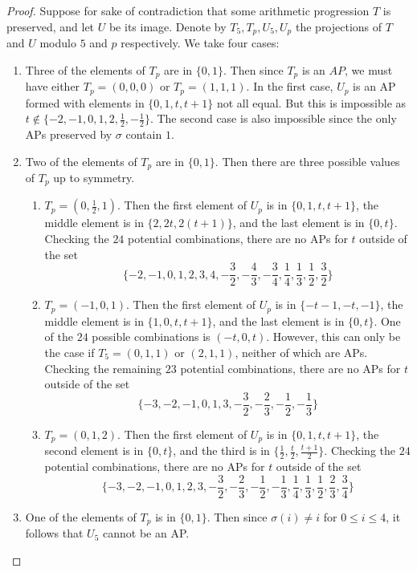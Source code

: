 \documentclass[12pt]{amsart}
\theoremstyle{definition}
\theoremstyle{remark}
\begin{document}
\begin{proof}
Suppose for sake of contradiction that some arithmetic progression $T$ is preserved, and let $U$ be its image. Denote by $T_5, T_p, U_5, U_p$ the projections of $T$ and $U$ modulo $5$ and $p$ respectively. We take four cases:
\begin{enumerate}
\item Three of the elements of $T_p$ are in $\{0, 1\}$. Then since $T_p$ is an $AP$, we must have either $T_p=(0, 0, 0)$ or $T_p=(1, 1, 1)$. In the first case, $U_p$ is an AP formed with elements in $\{0, 1, t, t+1\}$ not all equal. But this is impossible as $t\notin\{-2, -1, 0, 1, 2, \frac{1}{2}, -\frac{1}{2}\}$. The second case is also impossible since the only APs preserved by $\sigma$ contain $1$.
\item Two of the elements of $T_p$ are in $\{0, 1\}$. Then there are three possible values of $T_p$ up to symmetry. 
\begin{enumerate}
\item $T_p=(0, \frac{1}{2}, 1)$. Then the first element of $U_p$ is in $\{0, 1, t, t+1\}$, the middle element is in $\{2, 2t, 2(t+1)\}$, and the last element is in $\{0, t\}$. Checking the $24$ potential combinations, there are no APs for $t$ outside of the set
\[\{-2, -1, 0, 1, 2, 3, 4, -\frac{3}{2}, -\frac{4}{3}, -\frac{3}{4}, \frac{1}{4}, \frac{1}{3}, \frac{1}{2}, \frac{3}{2}\}\]
\item $T_p=(-1, 0, 1)$. Then the first element of $U_p$ is in $\{-t-1, -t, -1\}$, the middle element is in $\{1, 0, t, t+1\}$, and the last element is in $\{0, t\}$. One of the $24$ possible combinations is $(-t, 0, t)$. However, this can only be the case if $T_5=(0, 1, 1)$ or $(2, 1, 1)$, neither of which are APs. Checking the remaining $23$ potential combinations, there are no APs for $t$ outside of the set
\[\{-3, -2, -1, 0, 1, 3, -\frac{3}{2}, -\frac{2}{3}, -\frac{1}{2}, -\frac{1}{3}\} \]
\item $T_p=(0, 1, 2)$. Then the first element of $U_p$ is in $\{0, 1, t, t+1\}$, the second element is in $\{0, t\}$, and the third is in $\{\frac{1}{2}, \frac{t}{2}, \frac{t+1}{2}\}$. Checking the $24$ potential combinations, there are no APs for $t$ outside of the set
\[\{-3, -2, -1, 0, 1, 2, 3, -\frac{3}{2}, -\frac{2}{3}, -\frac{1}{2}, -\frac{1}{3}, \frac{1}{4}, \frac{1}{3}, \frac{1}{2}, \frac{2}{3}, \frac{3}{4}\}\]
\end{enumerate}
\item One of the elements of $T_p$ is in $\{0, 1\}$. Then since $\sigma(i)\neq i$ for $0\le i\le 4$, it follows that $U_5$ cannot be an AP.

\end{enumerate}
\end{proof}
\end{document}
